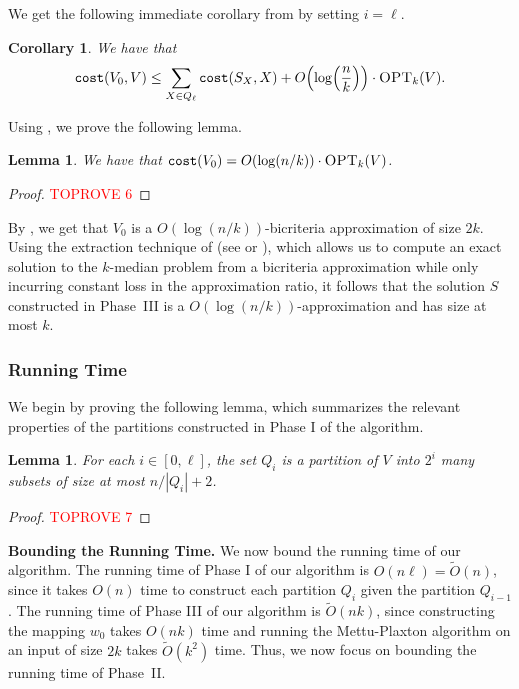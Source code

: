 \documentclass[11pt]{article}
\newcommand{\1}{\mathmybb{1}}
\newtheorem{lemma}[theorem]{Lemma}
\newtheorem{corollary}[theorem]{Corollary}
\newcommand{\OPT}{\textsc{OPT}}
\newcommand{\cost}{\textnormal{\texttt{cost}}}
\begin{document}
We get the following immediate corollary from  by setting $i = \ell$.

\begin{corollary}\label{eq:aa}
We have that
$$\cost(V_0, V) \leq \sum_{X \in Q_\ell} \cost(S_{X}, X) + O \!\left( \log \! \left(\frac{n}{k} \right)\right) \cdot \OPT_k(V).$$
\end{corollary}

Using , we prove the following lemma.

\begin{lemma}\label{lem:bound on V0}
    We have that $\cost(V_0) = O(\log(n/k)) \cdot \OPT_k(V)$.
\end{lemma}

\begin{proof}\textcolor{red}{TOPROVE 6}\end{proof}



By , we get that $V_0$ is a $O(\log(n/k))$-bicriteria approximation of size $2k$. Using the extraction technique of \cite{focs/GuhaMMO00} (see  or ), which allows us to compute an exact solution to the $k$-median problem from a bicriteria approximation while only incurring constant loss in the approximation ratio, it follows that the solution $S$ constructed in Phase~III is a $O(\log(n/k))$-approximation and has size at most $k$.

\subsubsection*{Running Time}

We begin by proving the following lemma, which summarizes the relevant properties of the partitions constructed in Phase I of the algorithm.

\begin{lemma}\label{lem:partitions:main}
    For each $i \in [0, \ell]$, the set $Q_i$ is a partition of $V$ into $2^i$ many subsets of size at most $n/|Q_i| + 2$.
\end{lemma}

\begin{proof}\textcolor{red}{TOPROVE 7}\end{proof}

\medskip
\noindent \textbf{Bounding the Running Time.}
We now bound the running time of our algorithm.
The running time of Phase I of our algorithm is $O(n \ell) = \tilde O(n)$, since it takes $O(n)$ time to construct each partition $Q_i$ given the partition $Q_{i-1}$. The running time of Phase III of our algorithm is $\tilde O(nk)$, since constructing the mapping $w_0$ takes $O(nk)$ time and running the Mettu-Plaxton algorithm on an input of size $2k$ takes $\tilde O(k^2)$ time.
Thus, we now focus on bounding the running time of Phase~II.
\end{document}
